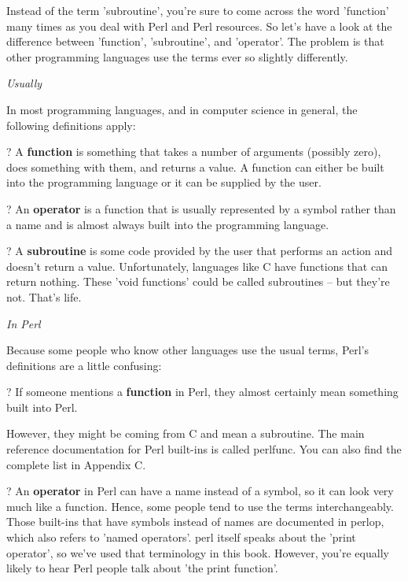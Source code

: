 \documentclass[a4paper,11pt]{book}
\begin{document}
\noindent 

\noindent Instead of the term 'subroutine', you're sure to come across the word 'function' many times as you deal with Perl and Perl resources. So let's have a look at the difference between 'function', 'subroutine', and 'operator'. The problem is that other programming languages use the terms ever so slightly differently.

\noindent 

\noindent \textit{Usually}

\noindent In most programming languages, and in computer science in general, the following definitions apply:

\noindent 

\noindent ? A \textbf{function }is something that takes a number of arguments (possibly zero), does something with them, and returns a value. A function can either be built into the programming language or it can be supplied by the user.

\noindent 

\noindent ? An \textbf{operator }is a function that is usually represented by a symbol rather than a name and is almost always built into the programming language.

\noindent 

\noindent ? A \textbf{subroutine }is some code provided by the user that performs an action and doesn't return a value. Unfortunately, languages like C have functions that can return nothing. These 'void functions' could be called subroutines -- but they're not. That's life.

\noindent 

\noindent 

\noindent \textit{In Perl}

\noindent Because some people who know other languages use the usual terms, Perl's definitions are a little confusing:

\noindent 

\noindent ? If someone mentions a \textbf{function }in Perl, they almost certainly mean something built into Perl.

\noindent However, they might be coming from C and mean a subroutine. The main reference documentation for Perl built-ins is called perlfunc. You can also find the complete list in Appendix C.

\noindent 

\noindent ? An \textbf{operator }in Perl can have a name instead of a symbol, so it can look very much like a function. Hence, some people tend to use the terms interchangeably. Those built-ins that have symbols instead of names are documented in perlop, which also refers to 'named operators'. perl itself speaks about the 'print operator', so we've used that terminology in this book. However, you're equally likely to hear Perl people talk about 'the print function'.
\end{document}
